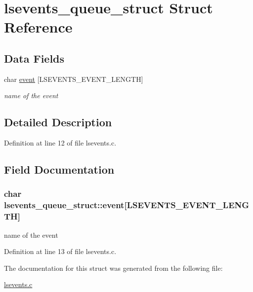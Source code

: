 \hypertarget{structlsevents__queue__struct}{
\section{lsevents\_\-queue\_\-struct Struct Reference}
\label{structlsevents__queue__struct}
}
\subsection*{Data Fields}
\begin{DoxyCompactItemize}
\item 
char \hyperlink{structlsevents__queue__struct_a945691e4f4afbca101722840a891581e}{event} \mbox{[}LSEVENTS\_\-EVENT\_\-LENGTH\mbox{]}
\begin{DoxyCompactList}\small\item\em name of the event \item\end{DoxyCompactList}\end{DoxyCompactItemize}


\subsection{Detailed Description}


Definition at line 12 of file lsevents.c.

\subsection{Field Documentation}
\hypertarget{structlsevents__queue__struct_a945691e4f4afbca101722840a891581e}{
\subsubsection[{event}]{\setlength{\rightskip}{0pt plus 5cm}char {\bf lsevents\_\-queue\_\-struct::event}\mbox{[}LSEVENTS\_\-EVENT\_\-LENGTH\mbox{]}}}
\label{structlsevents__queue__struct_a945691e4f4afbca101722840a891581e}


name of the event 

Definition at line 13 of file lsevents.c.

The documentation for this struct was generated from the following file:\begin{DoxyCompactItemize}
\item 
\hyperlink{lsevents_8c}{lsevents.c}\end{DoxyCompactItemize}
